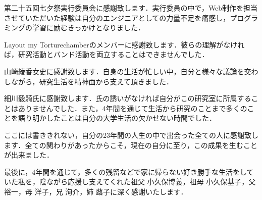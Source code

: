 第二十五回七夕祭実行委員会に感謝致します．実行委員の中で，Web制作を担当させていただいた経験は自分のエンジニアとしての力量不足を痛感し，プログラミングの学習に励むきっかけとなりました．


Layout my Torturechamberのメンバーに感謝致します．彼らの理解がなければ，研究活動とバンド活動を両立することはできませんでした．


山崎綾香女史に感謝致します．自身の生活が忙しい中，自分と様々な議論を交わしながら，研究生活を精神面から支えて頂きました．


細川毅騎氏に感謝致します．氏の誘いがなければ自分がこの研究室に所属することはありませんでした．また，4年間を通じて生活から研究のことまで多くのことを語り明かしたことは自分の大学生活の欠かせない時間でした．


ここには書ききれない，自分の23年間の人生の中で出会った全ての人に感謝致します．全ての関わりがあったからこそ，現在の自分に至り，この成果を生むことが出来ました．


最後に，4年間を通じて，多くの残留などで家に帰らない好き勝手な生活をしていた私を，陰ながら応援し支えてくれた祖父 小久保博義，祖母 小久保基子，父 裕一，母 洋子，兄 洵介，姉 蕗子に深く感謝いたします．



